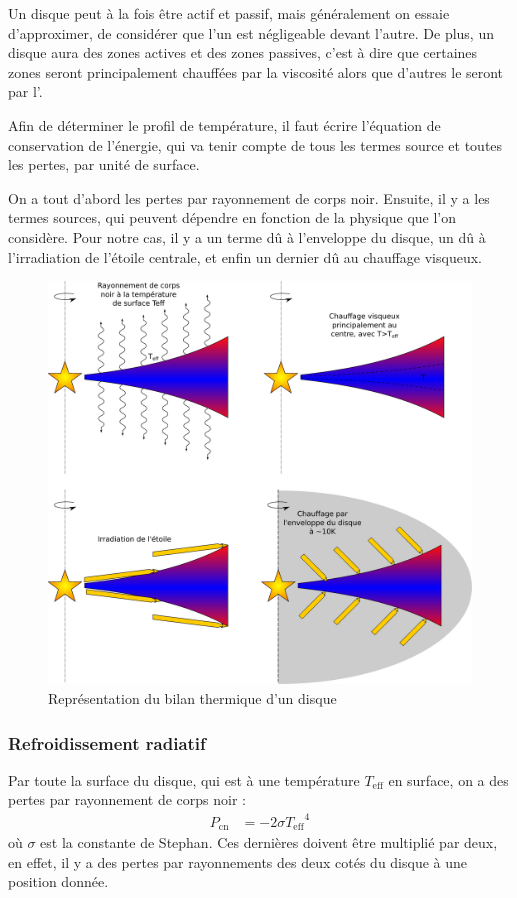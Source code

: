 Un disque peut à la fois être actif et passif, mais généralement on essaie d'approximer, de considérer que l'un est négligeable devant l'autre. De plus, un disque aura des zones actives et des zones passives, c'est à dire que certaines zones seront principalement chauffées par la viscosité alors que d'autres le seront par l'.

\bigskip

Afin de déterminer le profil de température, il faut écrire l'équation de conservation de l'énergie, qui va tenir compte de tous les termes source et toutes les pertes, par unité de surface.

On a tout d'abord les pertes par rayonnement de corps noir. Ensuite, il y a les termes sources, qui peuvent dépendre en fonction de la physique que l'on considère. Pour notre cas, il y a un terme dû à l'enveloppe du disque, un dû à l'irradiation de l'étoile centrale, et enfin un dernier dû au chauffage visqueux.


\begin{figure}[htb]
\centering
\includegraphics[width=0.45\linewidth]{figure/disk_energy.pdf}
\caption{Représentation du bilan thermique d'un disque}\label{fig:energy_equilibrium}
\end{figure}

\subsubsection{Refroidissement radiatif}
Par toute la surface du disque, qui est à une température $T_\text{eff}$ en surface, on a des pertes par rayonnement de corps noir : 
\begin{align}
P_\text{cn} &= - 2\sigma {T_\text{eff}}^4
\end{align}
où $\sigma$ est la constante de Stephan. Ces dernières doivent être multiplié par deux, en effet, il y a des pertes par rayonnements des deux cotés du disque à une position donnée. 

